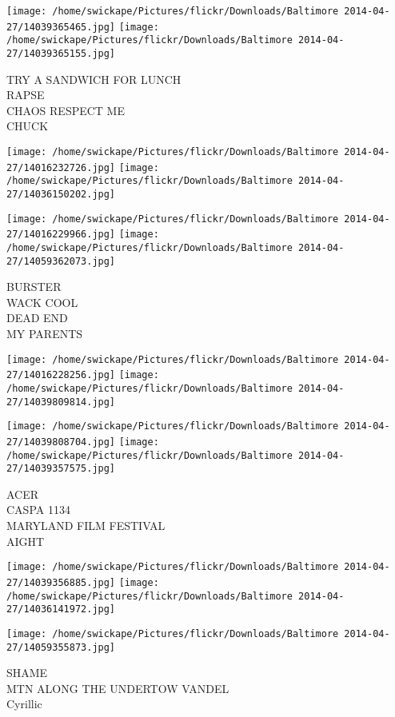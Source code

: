 \documentclass[10pt,letterpaper]{article}
\begin{document}
\texttt{[image: /home/swickape/Pictures/flickr/Downloads/Baltimore 2014-04-27/14039365465.jpg]}
\texttt{[image: /home/swickape/Pictures/flickr/Downloads/Baltimore 2014-04-27/14039365155.jpg]}

TRY A SANDWICH FOR LUNCH\\
RAPSE\\
CHAOS RESPECT ME\\
CHUCK\\
\pagebreak

\texttt{[image: /home/swickape/Pictures/flickr/Downloads/Baltimore 2014-04-27/14016232726.jpg]}
\texttt{[image: /home/swickape/Pictures/flickr/Downloads/Baltimore 2014-04-27/14036150202.jpg]}

\texttt{[image: /home/swickape/Pictures/flickr/Downloads/Baltimore 2014-04-27/14016229966.jpg]}
\texttt{[image: /home/swickape/Pictures/flickr/Downloads/Baltimore 2014-04-27/14059362073.jpg]}

BURSTER\\
WACK COOL\\
DEAD END\\
MY PARENTS\\
\pagebreak

\texttt{[image: /home/swickape/Pictures/flickr/Downloads/Baltimore 2014-04-27/14016228256.jpg]}
\texttt{[image: /home/swickape/Pictures/flickr/Downloads/Baltimore 2014-04-27/14039809814.jpg]}

\texttt{[image: /home/swickape/Pictures/flickr/Downloads/Baltimore 2014-04-27/14039808704.jpg]}
\texttt{[image: /home/swickape/Pictures/flickr/Downloads/Baltimore 2014-04-27/14039357575.jpg]}

ACER\\
CASPA 1134\\
MARYLAND FILM FESTIVAL\\
AIGHT\\
\pagebreak

\texttt{[image: /home/swickape/Pictures/flickr/Downloads/Baltimore 2014-04-27/14039356885.jpg]}
\texttt{[image: /home/swickape/Pictures/flickr/Downloads/Baltimore 2014-04-27/14036141972.jpg]}

\texttt{[image: /home/swickape/Pictures/flickr/Downloads/Baltimore 2014-04-27/14059355873.jpg]}

SHAME\\
MTN ALONG THE UNDERTOW VANDEL\\
Cyrillic\\
\pagebreak
\end{document}
